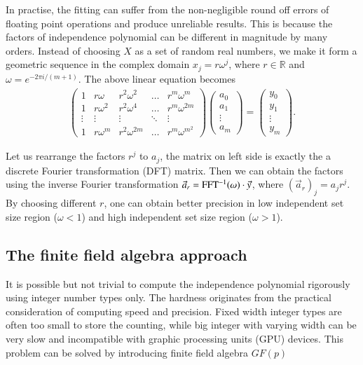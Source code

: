 \documentclass[review,onefignum,onetabnum]{siamart190516}
\newcommand{\<}{\langle}
\renewcommand{\>}{\rangle}
\begin{document}
In practise, the fitting can suffer from the non-negligible round off errors of floating point operations and produce unreliable results.
This is because the factors of independence polynomial can be different in magnitude by many orders.
Instead of choosing $X$ as a set of random real numbers, we make it form a geometric sequence in the complex domain $x_j = r\omega^j$, where $r \in \mathbb{R}$ and $\omega = e^{-2\pi i/(m+1)}$. The above linear equation becomes
\begin{align}
\left(\begin{matrix}
1 & r\omega & r^2\omega^2 & \ldots & r^m\omega^m \\
1 & r\omega^2 & r^2\omega^4 & \ldots & r^m\omega^{2m} \\
\vdots & \vdots & \vdots &\ddots & \vdots \\
1 & r\omega^m & r^2\omega^{2m} & \ldots & r^m\omega^{m^2}
\end{matrix}\right)
\left(\begin{matrix}
a_0 \\ a_1 \\ \vdots \\ a_m
\end{matrix}\right)
= \left(\begin{matrix}
y_0 \\ y_1 \\ \vdots \\ y_m
\end{matrix}\right).
\end{align}

Let us rearrange the factors $r^j$ to $a_j$, the matrix on left side is exactly the a discrete Fourier transformation (DFT) matrix.
Then we can obtain the factors using the inverse Fourier transformation $\vec a_r = {\rm FFT^{-1}}(\omega) \cdot \vec y$, where $(\vec a_r)_j = a_j r ^j$.
By choosing different $r$, one can obtain better precision in low independent set size region  ($\omega<1$) and high independent set size region ($\omega>1$).

\subsection{The finite field algebra approach}
It is possible but not trivial to compute the independence polynomial rigorously using integer number types only.
The hardness originates from the practical consideration of computing speed and precision.
Fixed width integer types are often too small to store the counting,
while big integer with varying width can be very slow and incompatible with graphic processing units (GPU) devices.
This problem can be solved by introducing finite field algebra $GF(p)$
\end{document}
